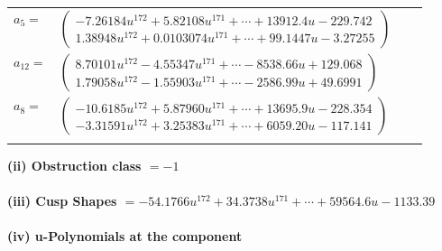 \documentclass[1p]{elsarticle_modified}
\theoremstyle{definition}
\begin{document}
\begin{tabular}{m{7pt} m{180pt} m{7pt} m{180pt} }
\flushright $a_{5}=$&$\begin{pmatrix}-7.26184 u^{172}+5.82108 u^{171}+\cdots+13912.4 u-229.742\\1.38948 u^{172}+0.0103074 u^{171}+\cdots+99.1447 u-3.27255\end{pmatrix}$ \\
\flushright $a_{12}=$&$\begin{pmatrix}8.70101 u^{172}-4.55347 u^{171}+\cdots-8538.66 u+129.068\\1.79058 u^{172}-1.55903 u^{171}+\cdots-2586.99 u+49.6991\end{pmatrix}$ \\
\flushright $a_{8}=$&$\begin{pmatrix}-10.6185 u^{172}+5.87960 u^{171}+\cdots+13695.9 u-228.354\\-3.31591 u^{172}+3.25383 u^{171}+\cdots+6059.20 u-117.141\end{pmatrix}$\\&\end{tabular}
\flushleft \textbf{(ii) Obstruction class $= -1$}\\~\\
\flushleft \textbf{(iii) Cusp Shapes $= -54.1766 u^{172}+34.3738 u^{171}+\cdots+59564.6 u-1133.39$}\\~\\
\newpage\renewcommand{\arraystretch}{1}
\flushleft \textbf{(iv) u-Polynomials at the component}\newline \\
\end{document}
